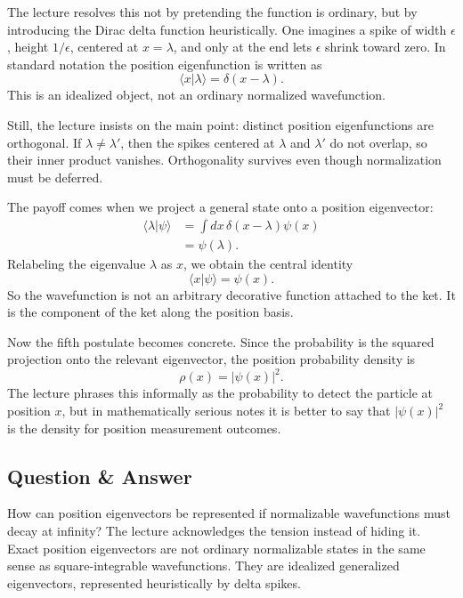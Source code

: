 The lecture resolves this not by pretending the function is ordinary, but by introducing the Dirac delta function heuristically. One imagines a spike of width \(\epsilon\), height \(1/\epsilon\), centered at \(x=\lambda\), and only at the end lets \(\epsilon\) shrink toward zero. In standard notation the position eigenfunction is written as
\begin{equation}
\langle x|\lambda\rangle = \delta(x-\lambda).
\end{equation}
This is an idealized object, not an ordinary normalized wavefunction.

Still, the lecture insists on the main point: distinct position eigenfunctions are orthogonal. If \(\lambda\neq \lambda'\), then the spikes centered at \(\lambda\) and \(\lambda'\) do not overlap, so their inner product vanishes. Orthogonality survives even though normalization must be deferred.

The payoff comes when we project a general state onto a position eigenvector:
\begin{align}
\langle \lambda|\psi\rangle
&=
\int dx\, \delta(x-\lambda)\psi(x) \\
&=
\psi(\lambda).
\end{align}
Relabeling the eigenvalue \(\lambda\) as \(x\), we obtain the central identity
\begin{equation}
\langle x|\psi\rangle = \psi(x).
\end{equation}
So the wavefunction is not an arbitrary decorative function attached to the ket. It is the component of the ket along the position basis.

Now the fifth postulate becomes concrete. Since the probability is the squared projection onto the relevant eigenvector, the position probability density is
\begin{equation}
\rho(x)=|\psi(x)|^2.
\end{equation}
The lecture phrases this informally as the probability to detect the particle at position \(x\), but in mathematically serious notes it is better to say that \(|\psi(x)|^2\) is the density for position measurement outcomes.

\subsection{Question \& Answer}

How can position eigenvectors be represented if normalizable wavefunctions must decay at infinity? The lecture acknowledges the tension instead of hiding it. Exact position eigenvectors are not ordinary normalizable states in the same sense as square-integrable wavefunctions. They are idealized generalized eigenvectors, represented heuristically by delta spikes.

